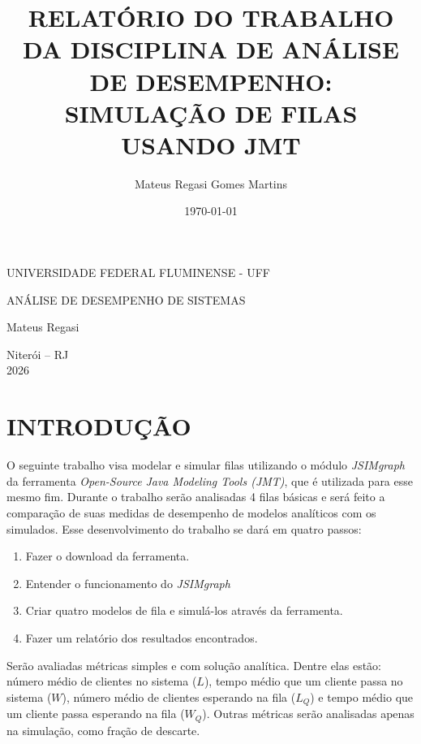 \documentclass{report}
\title{RELATÓRIO DO TRABALHO DA DISCIPLINA DE ANÁLISE DE DESEMPENHO: SIMULAÇÃO DE FILAS USANDO JMT}
\author{Mateus Regasi Gomes Martins}
\date{\today}
\begin{document}
\begin{titlepage}  
  
\begin{center}  
UNIVERSIDADE FEDERAL FLUMINENSE - UFF
\end{center}  
  
\vspace{8cm}  
  
\begin{center}  
{  
ANÁLISE DE DESEMPENHO DE SISTEMAS  
}  
\end{center}  
  
\vspace{1cm}  
  
\begin{flushright}  
Mateus Regasi  
\end{flushright}  
  
\vfill  
  
\begin{center}  
Niterói -- RJ\\  
2026  
\end{center}  
  
\end{titlepage}

\section{INTRODUÇÃO}
O seguinte trabalho visa modelar e simular filas utilizando o módulo \textit{JSIMgraph} da ferramenta \textit{Open-Source} \textit{Java Modeling Tools (JMT)}, que é utilizada para esse mesmo fim. Durante o trabalho serão analisadas 4 filas básicas e será feito a comparação de suas medidas de desempenho de modelos analíticos com os simulados. Esse desenvolvimento do trabalho se dará em quatro passos:

\begin{enumerate}
    \item Fazer o download da ferramenta.
    \item Entender o funcionamento do \textit{JSIMgraph}
    \item Criar quatro modelos de fila e simulá-los através da ferramenta.
    \item Fazer um relatório dos resultados encontrados.
\end{enumerate}

Serão avaliadas métricas simples e com solução analítica. Dentre elas estão: número médio de clientes no sistema ($L$), tempo médio que um cliente passa no sistema ($W$), número médio de clientes esperando na fila ($L_Q$) e tempo médio que um cliente passa esperando na fila ($W_Q$). Outras métricas serão analisadas apenas na simulação, como fração de descarte.
\end{document}
